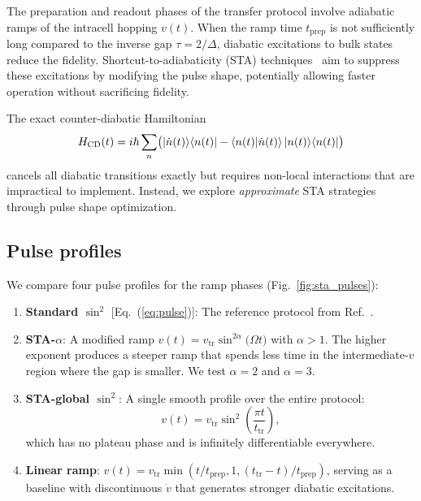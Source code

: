 \documentclass[
  reprint,
  amsmath,
  amssymb,
  aps,
  prb,
  longbibliography,
]{revtex4-2}
\newcommand{\ttr}{t_{\mathrm{tr}}}
\newcommand{\tprep}{t_{\mathrm{prep}}}
\begin{document}
The preparation and readout phases of the transfer protocol involve adiabatic
ramps of the intracell hopping $v(t)$. When the ramp time $\tprep$ is not
sufficiently long compared to the inverse gap $\tau = 2/\Delta$, diabatic
excitations to bulk states reduce the fidelity. Shortcut-to-adiabaticity
(STA) techniques~\cite{Demirplak2003, Berry2009, Chen2010, GueryOdelin2019}
aim to suppress these excitations by modifying the pulse shape, potentially
allowing faster operation without sacrificing fidelity.

The exact counter-diabatic Hamiltonian~\cite{Berry2009}
\begin{equation}
  H_{\mathrm{CD}}(t) = i\hbar \sum_n \bigl(\ket{\dot{n}(t)}\!\bra{n(t)}
  - \braket{n(t)|\dot{n}(t)} \ket{n(t)}\!\bra{n(t)}\bigr)
  \label{eq:cd}
\end{equation}
cancels all diabatic transitions exactly but requires non-local interactions
that are impractical to implement. Instead, we explore \emph{approximate}
STA strategies through pulse shape optimization.

\subsection{Pulse profiles}
\label{sec:pulses}

We compare four pulse profiles for the ramp phases (Fig.~\ref{fig:sta_pulses}):

\begin{enumerate}
  \item \textbf{Standard $\sin^2$} [Eq.~(\ref{eq:pulse})]: The reference
    protocol from Ref.~\cite{Zurita2023}.
  \item \textbf{STA-$\alpha$}: A modified ramp $v(t) = v_{\mathrm{tr}}
    \sin^{2\alpha}\!\bigl(\Omega t\bigr)$ with $\alpha > 1$. The higher
    exponent produces a steeper ramp that spends less time in the
    intermediate-$v$ region where the gap is smaller. We test $\alpha = 2$ and $\alpha = 3$.
  \item \textbf{STA-global $\sin^2$}: A single smooth profile over the entire
    protocol:
    \begin{equation}
      v(t) = v_{\mathrm{tr}} \sin^2\!\left(\frac{\pi t}{\ttr}\right),
      \label{eq:global_sin2}
    \end{equation}
    which has no plateau phase and is infinitely differentiable everywhere.
  \item \textbf{Linear ramp}: $v(t) = v_{\mathrm{tr}} \min(t/\tprep, 1,
    (\ttr - t)/\tprep)$, serving as a baseline with discontinuous $\dot{v}$
    that generates stronger diabatic excitations.
\end{enumerate}
\end{document}
